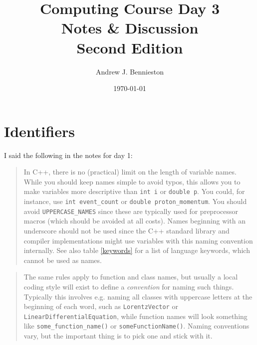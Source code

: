 \documentclass[a4paper]{scrartcl}
\title{Computing Course Day 3\\
Notes \& Discussion\\
Second Edition}
\author{Andrew J. Bennieston}
\date{\today}
\begin{document}
\maketitle

\tableofcontents

\listoftables

\pagebreak

\section{Identifiers}
I said the following in the notes for day 1:

\begin{quote}
In C++, there is no (practical) limit on the length of variable names. While you should keep names simple to avoid typos, this allows you to make variables more descriptive than \texttt{int i} or \texttt{double p}. You could, for instance, use \texttt{int event\_count} or \texttt{double proton\_momentum}. You should avoid \texttt{UPPERCASE\_NAMES} since these are typically used for preprocessor macros (which should be avoided at all costs). Names beginning with an underscore should not be used since the C++ standard library and compiler implementations might use variables with this naming convention internally. See also table \ref{keywords} for a list of language keywords, which cannot be used as names.
\end{quote}

\begin{quote}
The same rules apply to function and class names, but usually a local coding style will exist to define a \emph{convention} for naming such things. Typically this involves e.g. naming all classes with uppercase letters at the beginning of each word, such as \texttt{LorentzVector} or \texttt{LinearDifferentialEquation}, while function names will look something like \texttt{some\_function\_name()} or \texttt{someFunctionName()}. Naming conventions vary, but the important thing is to pick one and stick with it.
\end{quote}
\end{document}
